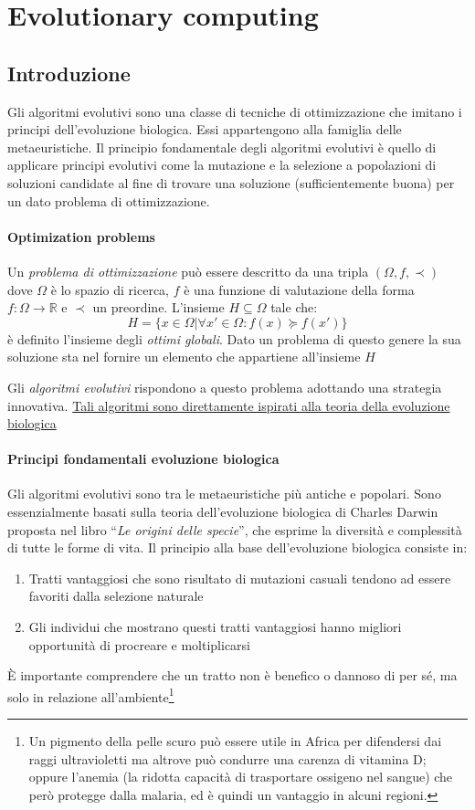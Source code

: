 \section{Evolutionary computing}

\subsection{Introduzione}
Gli algoritmi evolutivi sono una classe di tecniche di ottimizzazione che imitano i principi dell'evoluzione biologica. Essi appartengono alla famiglia delle metaeuristiche. Il principio fondamentale degli algoritmi evolutivi è quello di applicare principi evolutivi come la mutazione e la selezione a popolazioni di soluzioni candidate al fine di trovare una soluzione (sufficientemente buona) per un dato problema di ottimizzazione.

\paragraph{Optimization problems}
Un \textit{problema di ottimizzazione} può essere descritto da una tripla $(\Omega,f,\prec)$ dove $\Omega$ è lo spazio di ricerca, $f$ è una funzione di valutazione della forma $f:\Omega \to \mathbb{R}$ e $\prec$ un preordine. L'insieme $H \subseteq \Omega$ tale che:
$$H = \{ x \in \Omega | \forall x' \in \Omega: f(x) \succeq f(x') \}$$
è definito l'insieme degli \textit{ottimi globali}. Dato un problema di questo genere la sua soluzione sta nel fornire un elemento che appartiene all'insieme $H$

Gli \textit{algoritmi evolutivi} rispondono a questo problema adottando una strategia innovativa. \uline{Tali algoritmi sono direttamente ispirati alla teoria della evoluzione biologica}

\paragraph{Principi fondamentali evoluzione biologica}
Gli algoritmi evolutivi sono tra le metaeuristiche più antiche e popolari. Sono essenzialmente basati sulla teoria dell'evoluzione biologica di Charles Darwin proposta nel libro “\textit{Le origini delle specie}”, che esprime la diversità e complessità di tutte le forme di vita. Il principio alla base dell’evoluzione biologica consiste in:
\begin{enumerate}
    \item Tratti vantaggiosi che sono risultato di mutazioni casuali tendono ad essere favoriti dalla selezione naturale
    \item Gli individui che mostrano questi tratti vantaggiosi hanno migliori opportunità di procreare e moltiplicarsi
\end{enumerate}
È importante comprendere che un tratto non è benefico o dannoso di per sé, ma solo in relazione all'ambiente\footnote{Un pigmento della pelle scuro può essere utile in Africa per difendersi dai raggi ultravioletti ma altrove può condurre una carenza di vitamina D; oppure l’anemia (la ridotta capacità di trasportare ossigeno nel sangue) che però protegge dalla malaria, ed è quindi un vantaggio in alcuni regioni.}

